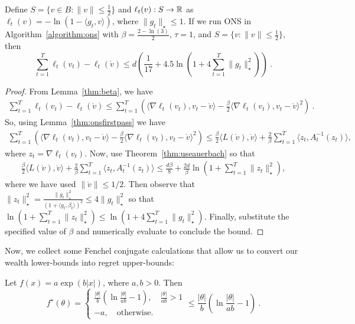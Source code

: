 \documentclass[12pt]{colt2018} %
\renewcommand{\v}{\mathring{v}}
\begin{document}
\begin{lemma}\label{thm:log_bound}
Define $S=\{v \in B: \|v\|\leq\frac{1}{2}\}$ and $\ell_t(v):S\rightarrow \mathbb{R}$ as $\ell_t(v)=-\ln(1-\langle g_t, v\rangle)$, where $\|g_t\|_\star \leq 1$.
If we run ONS in Algorithm~\ref{algorithm:ons} with $\beta=\frac{2-\ln(3)}{2}$, $\tau=1$, and $S=\{v : \|v\|\leq\frac{1}{2}\}$, then
\[
\sum_{t=1}^T \ell_t(v_t)-\ell_t(\v)
\leq d\left(\frac{1}{17} + 4.5 \ln\left(1+4 \sum_{t=1}^T \|g_t\|_\star ^2\right)\right)~.
\]
\end{lemma}
%
\begin{proof}
From Lemma~\ref{thm:beta}, we have
\begin{align*}
\sum_{t=1}^T \ell_t(v_t)-\ell_t(\v)
\le\sum_{t=1}^T \left(\langle \nabla \ell_t(v_t), v_t - \v\rangle  -\frac{\beta}{2} \langle \nabla \ell_t(v_t),v_t -\v\rangle^2\right)~.
\end{align*}
So, using Lemma~\ref{thm:onsfirstpass} we have
\begin{align*}
\sum_{t=1}^T \left(\langle \nabla \ell_t(v_t), v_t - \v\rangle  -\frac{\beta}{2}\langle \nabla \ell_t(v_t),v_t -\v\rangle^2\right)
\le \frac{\beta}{2} \langle L(\v), \v\rangle + \frac{2}{\beta} \sum_{t=1}^T \langle z_t,  A^{-1}_{t}(z_t)\rangle,
\end{align*}
where $z_t=\nabla \ell_t(v_t)$. Now, use Theorem~\ref{thm:useauerbach} so that 
\begin{align*}
\frac{\beta}{2} \langle L(\v),\v\rangle + \frac{2}{\beta}\sum_{t=1}^T \langle z_t,  A^{-1}_{t}(z_t) \rangle
\le \frac{d\beta}{8} + \frac{2d}{\beta} \ln\left(1+\sum_{t=1}^T \|z_t\|^2_\star \right),
\end{align*}
where we have used $\|\v\|\le 1/2$.
Then observe that $\|z_t\|_\star ^2=\frac{\|g_t\|_\star ^2}{(1+ \langle g_t, \beta_t\rangle )^2} \le 4\|g_t\|_\star ^2$ so that $\ln(1+\sum_{t=1}^T \|z_t\|_\star ^2)\le \ln(1+4\sum_{t=1}^T \|g_t\|_\star ^2)$. Finally, substitute the specified value of $\beta$ and numerically evaluate to conclude the bound.
\end{proof}


Now, we collect some Fenchel conjugate calculations that allow us to convert our wealth lower-bounds into regret upper-bounds:
\begin{lemma}
\label{lemma:fenchel_exp}
Let $f(x)=a \exp(b |x|)$, where $a,b>0$. Then 
\[
f^\star (\theta) = 
\begin{cases}
\frac{|\theta|}{b} \left(\ln \frac{|\theta|}{a b}-1\right),  \quad \frac{|\theta|}{a b} > 1 \\
-a,  \quad \text{otherwise.}
\end{cases}
\leq \frac{|\theta|}{b} \left(\ln\frac{|\theta|}{a b}-1\right)~.
\]
\end{lemma}
\end{document}
